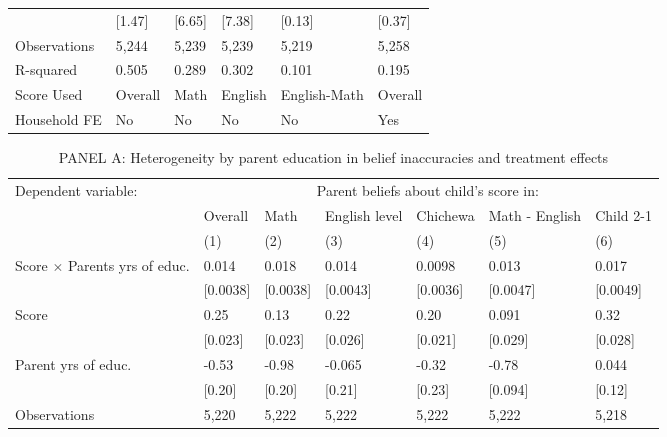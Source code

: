 \documentclass{article}
\begin{document}
\begin{table}[h!]
\begin{adjustbox}{width=\textwidth}
\begin{tabular}{p{5cm} p{2.5cm} p{2.5cm} p{2.5cm} p{2.5cm} p{2.5cm}}
                    &      [1.47]&      [6.65]&      [7.38]&      [0.13]&      [0.37]\\
\addlinespace
Observations        &       5,244&       5,239&       5,239&       5,219&       5,258\\
R-squared           &       0.505&       0.289&       0.302&       0.101&       0.195\\
\bottomrule
Score Used & Overall & Math & English & English-Math & Overall\\
Household FE & No & No &No &No & Yes \\
\bottomrule
\end{tabular}
\end{adjustbox}
\end{table}




\begin{table}[h!]
    \centering
    \caption{ PANEL A: Heterogeneity by parent education in belief inaccuracies and treatment effects }
    \begin{adjustbox}{width=\textwidth}
 \begin{tabular}{p{5cm} p{1.5cm} p{1.5cm} p{1.5cm} p{1.5cm} p{1.5cm} p{1.5cm}}
\toprule
\multirow{3}{*}{Dependent variable:} &  \multicolumn{6}{c}{Parent beliefs about child's score in:} \\
 & Overall & Math & English level & Chichewa & Math - English & Child 2-1 \\
 &  (1) &  (2) & (3) &  (4) & (5) & (6)\\
\midrule
\addlinespace
Score $\times$ Parents yrs of educ.&       0.014&       0.018&       0.014&      0.0098&       0.013&       0.017\\
                    &    [0.0038]&    [0.0038]&    [0.0043]&    [0.0036]&    [0.0047]&    [0.0049]\\
\addlinespace
Score               &        0.25&        0.13&        0.22&        0.20&       0.091&        0.32\\
                    &     [0.023]&     [0.023]&     [0.026]&     [0.021]&     [0.029]&     [0.028]\\
\addlinespace
Parent yrs of educ. &       -0.53&       -0.98&      -0.065&       -0.32&       -0.78&       0.044\\
                    &      [0.20]&      [0.20]&      [0.21]&      [0.23]&     [0.094]&      [0.12]\\
\addlinespace
\addlinespace[2pt] Observations&       5,220&       5,222&       5,222&       5,222&       5,222&       5,218\\
\bottomrule
\end{tabular} 
\end{adjustbox}
\end{table}
\end{document}
